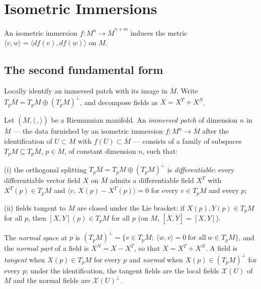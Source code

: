 \chapter{Isometric Immersions}
\label{chap:dc-isometric-immersions}
An isometric immersion $f:M^n\to\overline M^{n+m}$ induces the metric
$\langle v,w\rangle=\langle df(v),df(w)\rangle$ on $M$.
\section{The second fundamental form}

Locally identify an immersed patch with its image in $\overline M$. Write $T_p\overline M=T_pM\oplus(T_pM)^\perp$, and decompose fields as $X=X^T+X^N$.

\begin{definition}
  \label{def:dc-ch6-2-patch}
  \leanok
  Let $(\overline{M},\langle\,,\rangle)$ be a Riemannian manifold. An
  \emph{immersed patch} of dimension $n$ in $\overline{M}$ — the data furnished
  by an isometric immersion $f:M^n\to\overline{M}$ after the identification of
  $U\subset M$ with $f(U)\subset\overline{M}$ — consists of a family of
  subspaces $T_pM\subseteq T_p\overline{M}$, $p\in\overline{M}$, of constant
  dimension $n$, such that:

  (i) the orthogonal splitting $T_p\overline{M}=T_pM\oplus(T_pM)^\perp$ is
  \emph{differentiable}: every differentiable vector field $X$ on
  $\overline{M}$ admits a differentiable field $X^T$ with $X^T(p)\in T_pM$ and
  $\langle v,\,X(p)-X^T(p)\rangle=0$ for every $v\in T_pM$ and every $p$;

  (ii) fields tangent to $M$ are closed under the Lie bracket: if
  $X(p),Y(p)\in T_pM$ for all $p$, then $[X,Y](p)\in T_pM$ for all $p$ (on $M$,
  $[\overline{X},\overline{Y}]=[X,Y]$).

  The \emph{normal space} at $p$ is
  $(T_pM)^\perp=\{v\in T_p\overline{M};\ \langle w,v\rangle=0\ \text{for all}\
  w\in T_pM\}$, and the \emph{normal part} of a field is $X^N=X-X^T$, so that
  $X=X^T+X^N$. A field is \emph{tangent} when $X(p)\in T_pM$ for every $p$ and
  \emph{normal} when $X(p)\in(T_pM)^\perp$ for every $p$; under the
  identification, the tangent fields are the local fields $\mathcal{X}(U)$ of
  $M$ and the normal fields are $\mathcal{X}(U)^\perp$.
\end{definition}

